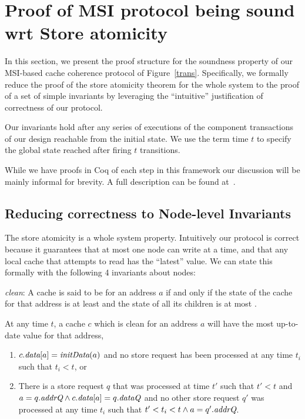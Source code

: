 \section{Proof of MSI protocol being sound wrt Store atomicity}
\label{safety}

In this section, we present the proof structure for the soundness
property of our MSI-based cache coherence protocol of
Figure~\ref{trans}. Specifically, we formally reduce the proof of the
store atomicity theorem for the whole system to the proof of a set of
simple invariants by leveraging the ``intuitive'' justification of
correctness of our protocol.


Our invariants hold after any series of executions of the component
transactions of our design reachable from the initial state. We use
the term time $t$ to specify the global state reached after firing $t$
transitions.

While we have proofs in Coq of each step in this framework our
discussion will be mainly informal for brevity. A full description can
be found at~.

\subsection{Reducing correctness to Node-level Invariants}

The store atomicity is a whole system property. Intuitively our
protocol is correct because it guarantees that at most one node can
write at a time, and that any local cache that attempts to read has
the ``latest'' value. We can state this formally with the following 4
invariants about nodes:

\begin{defn}
\textit{clean}: A cache is said to be \clean{} for an address $a$ if and only if
the state of the cache for that address is at least \Sh{} and the
state of all its children is at most \Sh.
\end{defn}
\begin{inv}
At any time $t$, a cache $c$ which is clean for an address $a$ will have the most
up-to-date value for that address, \ie{}
\begin{enumerate}
\item $c.\textit{data}[a] = \textit{initData}(a)$ and no store request has been
  processed at any time $t_i$ such that $t_i < t$, or
\item There is a store request $q$ that was processed at time $t'$ such that
$t' < t$ and $a = q.\textit{addrQ} \wedge c.\textit{data}[a] = q.\textit{dataQ}$ and no other store
request $q'$ was processed at any time $t_i$ such that $t' < t_i < t \wedge a =
q'.\textit{addrQ}$.
\end{enumerate}
\label{latestValue}
\end{inv}

